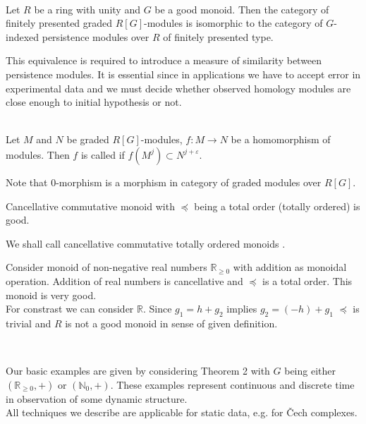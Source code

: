 \begin{theorem} {\cite[Theorem 21]{Corbet18}}\\
  Let $R$ be a ring with unity and $G$ be a good monoid. Then the category of finitely presented graded $R[G]$-modules is isomorphic to the category of $G$-indexed persistence modules over $R$ of finitely presented type.
\end{theorem}

This equivalence is required to introduce a measure of similarity between persistence modules. It is essential since in applications we have to accept error in experimental data and we must decide whether observed homology modules are close enough to initial hypothesis or not.

\begin{definition} {\cite[Definition 2.7]{GS16}}\\
  Let $M$ and $N$ be graded $R[G]$-modules, $f : M \to N$ be a homomorphism of modules. Then $f$ is called  if $f(M^j) \subset N^{j+\varepsilon}$.
\end{definition}

\begin{remark}
  Note that $0$-morphism is a morphism in category of graded modules over $R[G]$.
\end{remark}

\begin{remark}
  Cancellative commutative monoid with $\preceq$ being a total order (totally ordered) is good.
\end{remark}

\begin{definition}
  We shall call cancellative commutative totally ordered monoids .
\end{definition}

\begin{example}
  Consider monoid of non-negative real numbers $\mathbb{R}_{\geq 0}$ with addition as monoidal operation. Addition of real numbers is cancellative and $\preceq$ is a total order. This monoid is very good.\\

  For constrast we can consider $\mathbb{R}$. Since $g_1 = h + g_2$ implies $g_2 = (-h) + g_1$ $\preceq$ is trivial and $R$ is not a good monoid in sense of given definition.
\end{example}

\begin{remark} ~ \par
  Our basic examples are given by considering Theorem 2 with $G$ being either $(\mathbb{R}_{\geq 0},+)$ or $(\mathbb{N}_0,+)$. These examples represent continuous and discrete time in observation of some dynamic structure.\\

  All techniques we describe are applicable for static data, e.g. for Čech complexes.\\
\end{remark}

